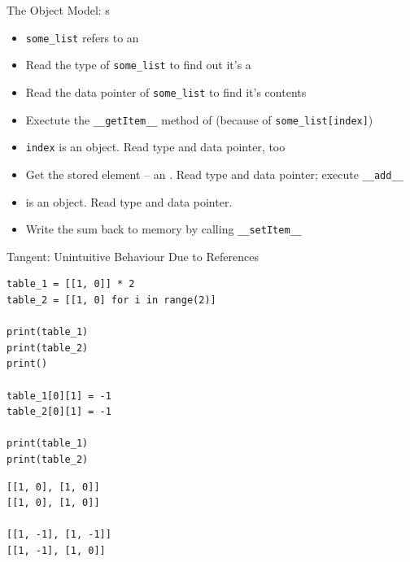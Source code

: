 \begin{frame}{The Object Model: s}
%
\begin{center}
\end{center}
%
\begin{itemize}
\item \texttt{some\_list} refers to an 
\item Read the type of \texttt{some\_list} to find out it's a 
\item Read the data pointer of \texttt{some\_list} to find it's contents
\item Exectute the \texttt{\_\_getItem\_\_} method of  (because of \texttt{some\_list[index]})
\item \texttt{index} is an object. Read type and data pointer, too
\item Get the stored element -- an . Read type and data pointer; execute \texttt{\_\_add\_\_}
\item {} is an object. Read type and data pointer.
\item Write the sum back to memory by calling \texttt{\_\_setItem\_\_}
\end{itemize}
%
\end{frame}


\begin{frame}[fragile]{Tangent: Unintuitive Behaviour Due to References}
%
\begin{tcbraster}[raster columns=2,
                  raster equal height,
                  nobeforeafter,
                  raster column skip=0.2cm]
%
\begin{codebox}[References.py]
\begin{verbatim}
table_1 = [[1, 0]] * 2
table_2 = [[1, 0] for i in range(2)]

print(table_1)
print(table_2)
print()

table_1[0][1] = -1
table_2[0][1] = -1

print(table_1)
print(table_2)
\end{verbatim}
\end{codebox}
%
\begin{cmdbox}
\begin{verbatim}
[[1, 0], [1, 0]]
[[1, 0], [1, 0]]

[[1, -1], [1, -1]]
[[1, -1], [1, 0]]
\end{verbatim}
\end{cmdbox}
%
\end{tcbraster}
%
\end{frame}

